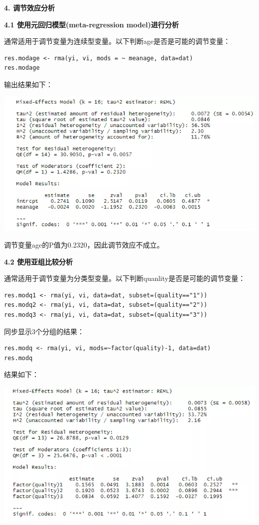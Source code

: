 \documentclass[
]{book}
\begin{document}
\textbf{4. 调节效应分析}

\textbf{4.1 使用元回归模型(meta-regression model)进行分析}

通常适用于调节变量为连续型变量。以下判断age是否是可能的调节变量：

\begin{verbatim}
res.modage <- rma(yi, vi, mods = ~ meanage, data=dat) 
res.modage 
\end{verbatim}

输出结果如下：

\includegraphics{figs/3241.png}

调节变量age的P值为0.2320，因此调节效应不成立。

\textbf{4.2 使用亚组比较分析}

通常适用于调节变量为分类型变量。以下判断quanlity是否是可能的调节变量：

\begin{verbatim}
res.modq1 <- rma(yi, vi, data=dat, subset=(quality=="1")) 
res.modq2 <- rma(yi, vi, data=dat, subset=(quality=="2")) 
res.modq3 <- rma(yi, vi, data=dat, subset=(quality=="3"))
\end{verbatim}

同步显示3个分组的结果：

\begin{verbatim}
res.modq <- rma(yi, vi, mods=~factor(quality)-1, data=dat)
res.modq
\end{verbatim}

结果如下：

\includegraphics{figs/3242.png}
\end{document}
